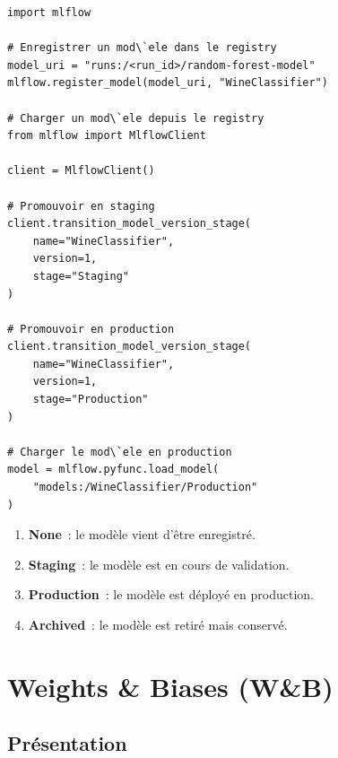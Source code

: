 \begin{codeblock}[title=\textbf{Utilisation du Model Registry}]
\begin{verbatim}
import mlflow

# Enregistrer un mod\`ele dans le registry
model_uri = "runs:/<run_id>/random-forest-model"
mlflow.register_model(model_uri, "WineClassifier")

# Charger un mod\`ele depuis le registry
from mlflow import MlflowClient

client = MlflowClient()

# Promouvoir en staging
client.transition_model_version_stage(
    name="WineClassifier",
    version=1,
    stage="Staging"
)

# Promouvoir en production
client.transition_model_version_stage(
    name="WineClassifier",
    version=1,
    stage="Production"
)

# Charger le mod\`ele en production
model = mlflow.pyfunc.load_model(
    "models:/WineClassifier/Production"
)
\end{verbatim}
\end{codeblock}

\begin{bonnepratique}[title=\textbf{Workflow du Model Registry}]
\begin{enumerate}
  \item \textbf{None}~: le mod\`ele vient d'\^etre enregistr\'e.
  \item \textbf{Staging}~: le mod\`ele est en cours de validation.
  \item \textbf{Production}~: le mod\`ele est d\'eploy\'e en production.
  \item \textbf{Archived}~: le mod\`ele est retir\'e mais conserv\'e.
\end{enumerate}
\end{bonnepratique}

\section{Weights \& Biases (W\&B)}
\label{sec:wandb}


\subsection{Pr\'esentation}

